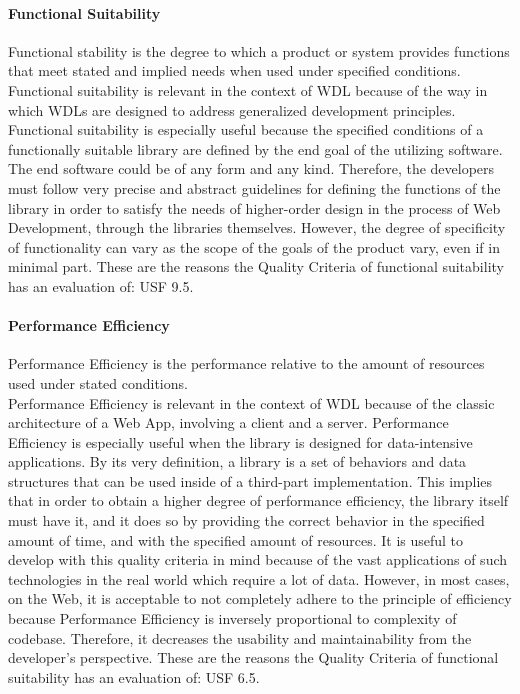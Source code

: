 \documentclass{article}
\begin{document}
\paragraph*{Functional Suitability}
Functional stability is the degree to which a product or system provides functions that meet stated and implied needs when used under specified conditions.\\
Functional suitability is relevant in the context of WDL because of the way in which WDLs are designed to address generalized development principles.
Functional suitability is especially useful because the specified conditions of a functionally suitable library are defined by the end goal of the utilizing software. The end software could be of any form and any kind. Therefore, the developers must follow very precise and abstract guidelines for defining the functions of the library in order to satisfy the needs of higher-order design in the process of Web Development, through the libraries themselves.
However, the degree of specificity of functionality can vary as the scope of the goals of the product vary, even if in minimal part.
These are the reasons the Quality Criteria of functional suitability has an evaluation of: USF 9.5.

\paragraph*{Performance Efficiency}
Performance Efficiency is the performance relative to the amount of resources used under stated conditions.\\
Performance Efficiency is relevant in the context of WDL because of the classic architecture of a Web App, involving a client and a server.
Performance Efficiency is especially useful when the library is designed for data-intensive applications. By its very definition, a library is a set of behaviors and data structures that can be used inside of a third-part implementation. This implies that in order to obtain a higher degree of performance efficiency, the library itself must have it, and it does so by providing the correct behavior in the specified amount of time, and with the specified amount of resources. It is useful to develop with this quality criteria in mind because of the vast applications of such technologies in the real world which require a lot of data. However, in most cases, on the Web, it is acceptable to not completely adhere to the principle of efficiency because Performance Efficiency is inversely proportional to complexity of codebase. Therefore, it decreases the usability and maintainability from the developer's perspective.
These are the reasons the Quality Criteria of functional suitability has an evaluation of: USF 6.5.
\end{document}
